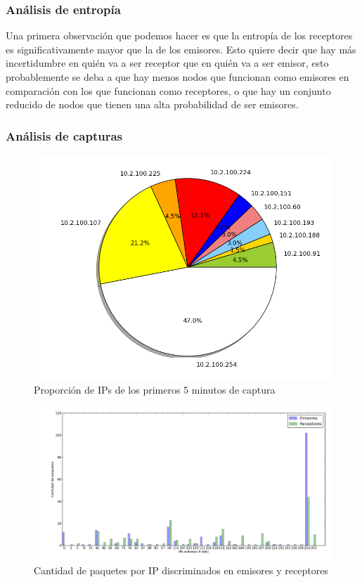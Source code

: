 \subsubsection{Análisis de entropía}
Una primera observación que podemos hacer es que la entropía de los receptores es significativamente mayor que la de los emisores. Esto quiere decir que hay más incertidumbre en quién va a ser receptor que en quién va a ser emisor, esto probablemente se deba a que hay menos nodos que funcionan como emisores en comparación con los que funcionan como receptores, o que hay un conjunto reducido de nodos que tienen una alta probabilidad de ser emisores.


\subsubsection{Análisis de capturas}
\begin{figure}[!h]
  \includegraphics[width=\textwidth,keepaspectratio]{graph/torta-facu.png}
  \caption{Proporción de IPs de los primeros 5 minutos de captura}
  \label{fig:torta-facu}
\end{figure}

\begin{figure}[!h]
  \includegraphics[width=\textwidth,keepaspectratio]{graph/barras-facu.png}
  \caption{Cantidad de paquetes por IP discriminados en emisores y receptores}
  \label{fig:barras-facu}
\end{figure}

